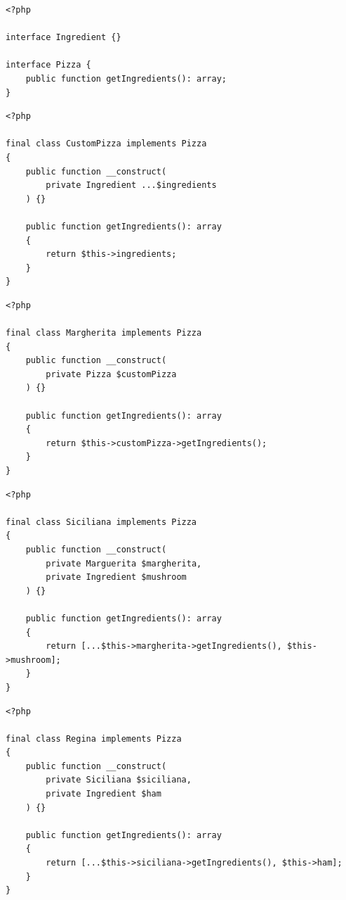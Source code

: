 \begin{frame}[fragile,c]
    \begin{lstlisting}
<?php

interface Ingredient {}

interface Pizza {
    public function getIngredients(): array;
}
    \end{lstlisting}
\end{frame}

\begin{frame}[fragile,c]
    \begin{lstlisting}
<?php

final class CustomPizza implements Pizza
{
    public function __construct(
        private Ingredient ...$ingredients
    ) {}

    public function getIngredients(): array
    {
        return $this->ingredients;
    }
}
    \end{lstlisting}
\end{frame}

\begin{frame}[fragile,c]
    \begin{lstlisting}
<?php

final class Margherita implements Pizza
{
    public function __construct(
        private Pizza $customPizza
    ) {}

    public function getIngredients(): array
    {
        return $this->customPizza->getIngredients();
    }
}
    \end{lstlisting}
\end{frame}

\begin{frame}[fragile,c]
    \begin{lstlisting}
<?php

final class Siciliana implements Pizza
{
    public function __construct(
        private Marguerita $margherita,
        private Ingredient $mushroom
    ) {}

    public function getIngredients(): array
    {
        return [...$this->margherita->getIngredients(), $this->mushroom];
    }
}
    \end{lstlisting}
\end{frame}

\begin{frame}[fragile,c]
    \begin{lstlisting}
<?php

final class Regina implements Pizza
{
    public function __construct(
        private Siciliana $siciliana,
        private Ingredient $ham
    ) {}

    public function getIngredients(): array
    {
        return [...$this->siciliana->getIngredients(), $this->ham];
    }
}
    \end{lstlisting}
\end{frame}

